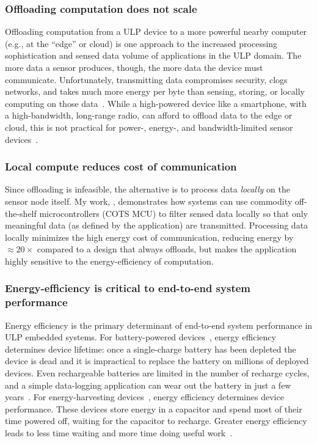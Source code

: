 \subsubsection{Offloading computation does not scale}
Offloading computation from a ULP device to a more powerful nearby computer (e.g., at the ``edge'' or cloud) is one approach to the increased processing sophistication and sensed data volume of applications in the ULP domain.
%
The more data a sensor produces, though, the more data the device must
communicate.
%
Unfortunately, transmitting data compromises security, clogs networks, and takes much more energy per byte than
sensing, storing, or locally computing on those data~\cite{sonic,zebranet}.  
%
While a high-powered device like a smartphone, with a high-bandwidth,
long-range radio, can afford to offload data to the edge or cloud,
this is not practical for power-, energy-, and bandwidth-limited sensor devices~\cite{dongare2017openchirp,sonic}.

\subsubsection{Local compute reduces cost of communication}
Since offloading is infeasible,
the alternative is to process data \emph{locally} on the sensor node itself.
% 
My work, \sonic, demonstrates how systems can use commodity off-the-shelf microcontrollers (COTS MCU) to filter sensed data locally so that only meaningful data (as defined by the application) are transmitted.
% 
Processing data locally minimizes the high energy cost of communication, reducing energy by $\approx20\times$ compared to a design that always offloads, but makes the application highly sensitive to the energy-efficiency of computation.

\subsubsection{Energy-efficiency is critical to end-to-end system performance}
Energy efficiency is the primary determinant of end-to-end system performance in ULP embedded systems.
% 
For battery-powered devices~\cite{culler2002mica,rowe2011sensor}, energy efficiency determines device lifetime: once a single-charge battery has been depleted the device is dead and it is impractical to replace the battery on millions of deployed devices.
% 
Even rechargeable batteries are limited in the number of recharge cycles, and a simple data-logging application can wear out the battery in just a few years~\cite{jackson_2019,nardello2019camaroptera}.
% 
For energy-harvesting devices~\cite{colin2018reconfigurable,hester2015tragedy,flicker,moo,windware}, energy efficiency determines device performance.
% 
These devices store energy in a capacitor and spend most of their time powered off, waiting for the capacitor to recharge.
% 
Greater energy efficiency leads to less time waiting and more time doing useful work~\cite{desai2020power}.

